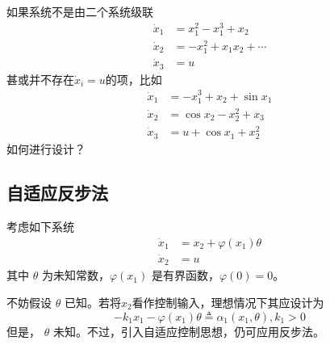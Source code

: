 \begin{problem}\label{Pro:backstep-complex}
如果系统不是由二个系统级联
    \begin{align*}
    \dot{x}_1 & = x^2_1 - x^3_1 + x_2\\
    \dot{x}_2 & = - x^2_1 + x_1 x_2 + \cdots \\
    \dot{x}_3 & = u
  \end{align*}
  甚或并不存在$\dot{x}_i=u$的项，比如
  \begin{align*}
    \dot{x}_1 & = -x_1^3+ x_2+\sin x_1\\
    \dot{x}_2 & = \cos x_2-x_2^2 + x_3 \\
    \dot{x}_3 & = u +\cos x_1 +x_2^2
  \end{align*}
  如何进行设计？
\end{problem}

\subsection{自适应反步法}

考虑如下系统
\begin{equation}
    \begin{aligned}
  \dot{x}_1 & = x_2 + \varphi (x_1) \theta\\
  \dot{x}_2 & = u
\end{aligned}\label{Sys:adaptive_backstepping}
\end{equation}
其中 $\theta$ 为未知常数，$\varphi (x_1)$ 是有界函数，$\varphi (0) = 0$。

不妨假设 $\theta$ 已知。若将$x_2$看作控制输入，理想情况下其应设计为
\[- k_1 x_1 - \varphi (x_1) \theta \triangleq \alpha_1 (x_1,\theta), k_1 > 0
\]
但是， $\theta$ 未知。不过，引入自适应控制思想，仍可应用反步法。


